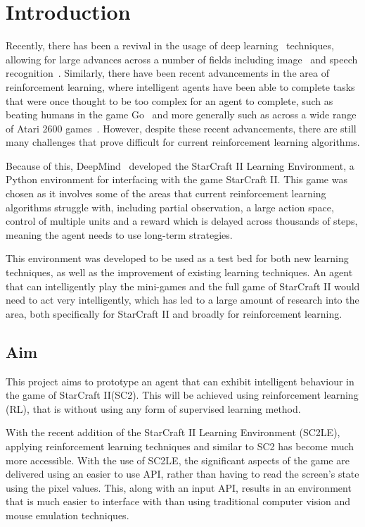 \chapter{Introduction}%
\label{intro}

Recently, there has been a revival in the usage of deep
learning~\cite{lecun2015deep} techniques, allowing for large advances across a
number of fields including image~\cite{krizhevsky2012imagenet} and speech
recognition~\cite{graves2013speech, hinton2012deep}. Similarly, there have been
recent advancements in the area of reinforcement learning, where intelligent
agents have been able to complete tasks that were once thought to be too complex
for an agent to complete, such as beating humans in the game
Go~\cite{silver2016mastering} and more generally such as across a wide range of
Atari 2600 games~\cite{mnih2015human}. However, despite these recent
advancements, there are still many challenges that prove difficult for current
reinforcement learning algorithms.

Because of this, DeepMind~\cite{deepmind} developed the
StarCraft II Learning Environment\cite{vinyals2017starcraft}, a Python
environment for interfacing with the game StarCraft II\cite{pysc2, starcraft2}.
This game was chosen as it involves some of the areas that current reinforcement
learning algorithms struggle with, including partial observation, a large action
space, control of multiple units and a reward which is delayed across thousands of
steps, meaning the agent needs to use long-term strategies.

This environment was developed to be used as a test bed for both new learning
techniques, as well as the improvement of existing learning techniques. An agent
that can intelligently play the mini-games and the full game of StarCraft II
would need to act very intelligently, which has led to a large amount of
research into the area, both specifically for StarCraft II and broadly for
reinforcement learning.

\section{Aim}

This project aims to prototype an agent that can exhibit intelligent behaviour
in the game of StarCraft II\@ (SC2). This will be achieved using reinforcement
learning (RL), that is without using any form of supervised learning method.

With the recent addition of the StarCraft II Learning Environment (SC2LE),
applying reinforcement learning techniques and similar to SC2 has become much
more accessible. With the use of SC2LE, the significant aspects of the game are
delivered using an easier to use API, rather than having to read the screen's
state using the pixel values. This, along with an input API, results in an
environment that is much easier to interface with than using traditional
computer vision and mouse emulation techniques.

